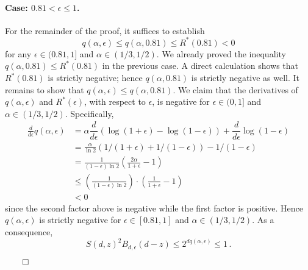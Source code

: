   \paragraph{Case: $0.81 < \epsilon \leq 1$.}
  For the remainder of the proof, it suffices to establish
  \[
      q(\alpha, \epsilon) \leq q(\alpha, 0.81) \leq R^*(0.81) < 0
  \]
  for any $\epsilon \in (0.81, 1]$ and $\alpha \in (1/3, 1/2)$. 
  We already proved the inequality $q(\alpha, 0.81) \leq R^*(0.81)$ in the previous case. 
  A direct calculation shows that $R^*(0.81)$ is strictly negative; 
  hence $q(\alpha, 0.81)$ is strictly negative as well. 
  It remains to show that $q(\alpha, \epsilon) \leq q(\alpha, 0.81)$.
  We claim that the derivatives of $q(\alpha, \epsilon)$ and $R^*(\epsilon)$, 
  with respect to $\epsilon$, is negative for $\epsilon \in (0, 1]$ and $\alpha \in (1/3, 1/2)$. 
  Specifically,
  \begin{align*}
      \frac{d}{d\epsilon} q(\alpha, \epsilon)
      &= \alpha \dfrac{d}{d\epsilon} \left( \log(1+\epsilon) - \log(1-\epsilon)\right) 
          + \dfrac{d}{d\epsilon} \log(1-\epsilon) \\
      &= \frac{\alpha}{\ln 2}\left( 1/(1+\epsilon) + 1/(1-\epsilon)\right)
          - 1/(1-\epsilon) \\
      &= \frac{1}{(1-\epsilon)\ln 2}\left( \frac{2\alpha}{1+\epsilon} - 1\right) \\
      &\leq \left(\frac{1}{(1-\epsilon)\ln 2} \right) \cdot \left( \frac{1}{1+\epsilon} - 1\right) \\
      &< 0
  \end{align*}
  since the second factor above is negative while the first factor is positive.
  Hence $q(\alpha, \epsilon)$ is strictly negative for 
  $\epsilon \in [0.81, 1]$ and $\alpha \in (1/3, 1/2)$. 
  As a consequence,
  \[
      S(d, z)^2 B_{d,\epsilon}(d-z) 
      \leq 2^{d q(\alpha, \epsilon)} 
      \leq 1
      \,.
  \]

\hfill$\qed$